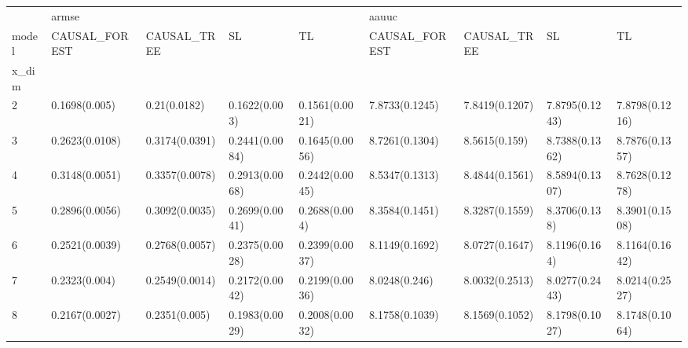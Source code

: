\begin{tabular}{lllllllll}
\toprule
{} & \multicolumn{4}{l}{armse} & \multicolumn{4}{l}{aauuc} \\
model &   CAUSAL\_FOREST &     CAUSAL\_TREE &              SL &              TL &   CAUSAL\_FOREST &     CAUSAL\_TREE &              SL &              TL \\
x\_dim &                 &                 &                 &                 &                 &                 &                 &                 \\
\midrule
2     &   0.1698(0.005) &    0.21(0.0182) &   0.1622(0.003) &  0.1561(0.0021) &  7.8733(0.1245) &  7.8419(0.1207) &  7.8795(0.1243) &  7.8798(0.1216) \\
3     &  0.2623(0.0108) &  0.3174(0.0391) &  0.2441(0.0084) &  0.1645(0.0056) &  8.7261(0.1304) &   8.5615(0.159) &  8.7388(0.1362) &  8.7876(0.1357) \\
4     &  0.3148(0.0051) &  0.3357(0.0078) &  0.2913(0.0068) &  0.2442(0.0045) &  8.5347(0.1313) &  8.4844(0.1561) &  8.5894(0.1307) &  8.7628(0.1278) \\
5     &  0.2896(0.0056) &  0.3092(0.0035) &  0.2699(0.0041) &   0.2688(0.004) &  8.3584(0.1451) &  8.3287(0.1559) &   8.3706(0.138) &  8.3901(0.1508) \\
6     &  0.2521(0.0039) &  0.2768(0.0057) &  0.2375(0.0028) &  0.2399(0.0037) &  8.1149(0.1692) &  8.0727(0.1647) &   8.1196(0.164) &  8.1164(0.1642) \\
7     &   0.2323(0.004) &  0.2549(0.0014) &  0.2172(0.0042) &  0.2199(0.0036) &   8.0248(0.246) &  8.0032(0.2513) &  8.0277(0.2443) &  8.0214(0.2527) \\
8     &  0.2167(0.0027) &   0.2351(0.005) &  0.1983(0.0029) &  0.2008(0.0032) &  8.1758(0.1039) &  8.1569(0.1052) &  8.1798(0.1027) &  8.1748(0.1064) \\
\bottomrule
\end{tabular}
